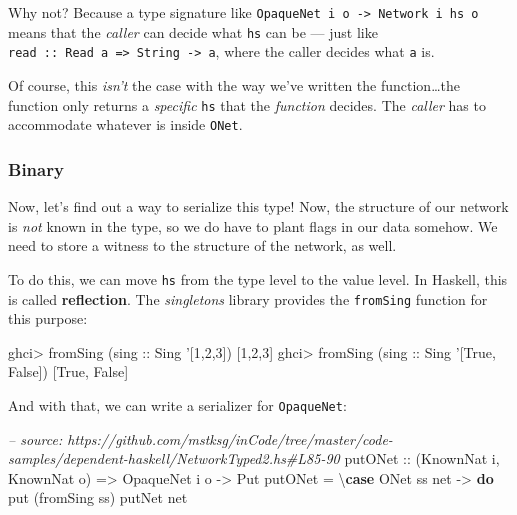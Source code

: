\documentclass[]{article}
\newenvironment{Shaded}{}{}
\newcommand{\KeywordTok}[1]{\textcolor[rgb]{0.00,0.44,0.13}{\textbf{{#1}}}}
\newcommand{\DataTypeTok}[1]{\textcolor[rgb]{0.56,0.13,0.00}{{#1}}}
\newcommand{\DecValTok}[1]{\textcolor[rgb]{0.25,0.63,0.44}{{#1}}}
\newcommand{\CharTok}[1]{\textcolor[rgb]{0.25,0.44,0.63}{{#1}}}
\newcommand{\CommentTok}[1]{\textcolor[rgb]{0.38,0.63,0.69}{\textit{{#1}}}}
\newcommand{\OtherTok}[1]{\textcolor[rgb]{0.00,0.44,0.13}{{#1}}}
\newcommand{\FunctionTok}[1]{\textcolor[rgb]{0.02,0.16,0.49}{{#1}}}
\newcommand{\NormalTok}[1]{{#1}}
\begin{document}
Why not? Because a type signature like
\texttt{OpaqueNet\ i\ o\ -\textgreater{}\ Network\ i\ hs\ o} means that the
\emph{caller} can decide what \texttt{hs} can be --- just like
\texttt{read\ ::\ Read\ a\ =\textgreater{}\ String\ -\textgreater{}\ a}, where
the caller decides what \texttt{a} is.

Of course, this \emph{isn't} the case with the way we've written the
function\ldots{}the function only returns a \emph{specific} \texttt{hs} that the
\emph{function} decides. The \emph{caller} has to accommodate whatever is inside
\texttt{ONet}.

\subsubsection{Binary}\label{binary}

Now, let's find out a way to serialize this type! Now, the structure of our
network is \emph{not} known in the type, so we do have to plant flags in our
data somehow. We need to store a witness to the structure of the network, as
well.

To do this, we can move \texttt{hs} from the type level to the value level. In
Haskell, this is called \textbf{reflection}. The \emph{singletons} library
provides the \texttt{fromSing} function for this purpose:

\begin{Shaded}
\begin{Highlighting}[]
\NormalTok{ghci}\FunctionTok{>} \NormalTok{fromSing (}\OtherTok{sing ::} \DataTypeTok{Sing} \CharTok{'[1,2,3])}
\NormalTok{[}\DecValTok{1}\NormalTok{,}\DecValTok{2}\NormalTok{,}\DecValTok{3}\NormalTok{]}
\NormalTok{ghci}\FunctionTok{>} \NormalTok{fromSing (}\OtherTok{sing ::} \DataTypeTok{Sing} \CharTok{'[True, False])}
\NormalTok{[}\DataTypeTok{True}\NormalTok{, }\DataTypeTok{False}\NormalTok{]}
\end{Highlighting}
\end{Shaded}

And with that, we can write a serializer for \texttt{OpaqueNet}:

\begin{Shaded}
\begin{Highlighting}[]
\CommentTok{-- source: https://github.com/mstksg/inCode/tree/master/code-samples/dependent-haskell/NetworkTyped2.hs#L85-90}
\OtherTok{putONet ::} \NormalTok{(}\DataTypeTok{KnownNat} \NormalTok{i, }\DataTypeTok{KnownNat} \NormalTok{o)}
        \OtherTok{=>} \DataTypeTok{OpaqueNet} \NormalTok{i o}
        \OtherTok{->} \DataTypeTok{Put}
\NormalTok{putONet }\FunctionTok{=} \NormalTok{\textbackslash{}}\KeywordTok{case} \DataTypeTok{ONet} \NormalTok{ss net }\OtherTok{->} \KeywordTok{do}
                  \NormalTok{put (fromSing ss)}
                  \NormalTok{putNet net}
\end{Highlighting}
\end{Shaded}
\end{document}
